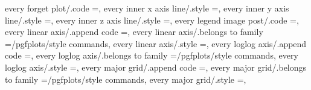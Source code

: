 {{{{{{{{every forget plot/.code                                            ={},                                                                                                                               
every inner x axis line/.style                                     ={},                                                                                                                                
every inner y axis line/.style                                     ={},                                                                                                                                
every inner z axis line/.style                                     ={},                                                                                                                                
every legend image post/.code                                      ={},                                                                                                                               
every linear axis/.append code                                     ={},                                                                          
every linear axis/.belongs to family                               =/pgfplots/style commands,                                                                                                          
every linear axis/.style                                           ={},                                                                                                                                
every loglog axis/.append code                                     ={},                                                                          
every loglog axis/.belongs to family                               =/pgfplots/style commands,                                                                                                          
every loglog axis/.style                                           ={},                                                                                                                                
every major grid/.append code                                      ={},                                                                           
every major grid/.belongs to family                                =/pgfplots/style commands,                                                                                                          
every major grid/.style                                            ={},                                                                                                                                
}}}}}}}}
